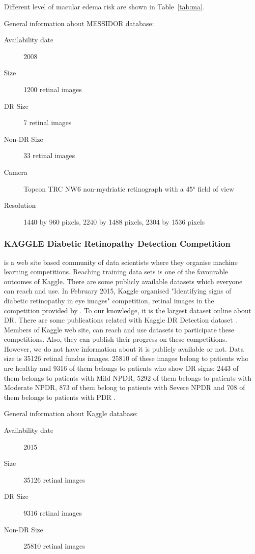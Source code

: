 Different level of macular edema risk are shown in Table~\ref{tab:ma}.


General information about MESSIDOR database:

\begin{description}
    \item[Availability date] 2008
    \item[Size] 1200 retinal images
    \item[DR Size] 7 retinal images
    \item[Non-DR Size] 33 retinal images
    \item[Camera]  Topcon TRC NW6 non-mydriatic retinograph with a 45° field of view
    \item[Resolution] 1440 by 960 pixels, 2240 by 1488 pixels, 2304 by 1536 pixels
\end{description}


\subsubsection{KAGGLE Diabetic Retinopathy Detection Competition}
\citet{KAGGLE} is a web site based community of data scientists where they organise machine learning competitions. Reaching training data sets is one of the favourable outcomes of Kaggle. There are some publicly available datasets which everyone can reach and use. In February 2015, Kaggle organised "Identifying signs of diabetic retinopathy in eye images" competition, retinal images in the competition provided by \citet{eyePACS}. To our knowledge, it is the largest dataset online about DR. There are some publications related with Kaggle DR Detection dataset \citep{albanautomated} \citep{van2016fast}. Members of Kaggle web site, can reach and use datasets to participate these competitions. Also, they can publish their progress on these competitions. However, we do not have information about it is publicly available or not. Data size is 35126 retinal fundus images\citep{van2016fast}. 25810 of these images belong to patients who are healthy and 9316 of them belongs to patients who show DR signs; 2443 of them belongs to patients with Mild NPDR, 5292 of them belongs to patients with Moderate NPDR, 873 of them belong to patients with Severe NPDR and 708 of them belongs to patients with PDR \citep{albanautomated}. 


General information about Kaggle database:
\begin{description}
    \item[Availability date] 2015
    \item[Size] 35126 retinal images
    \item[DR Size] 9316 retinal images
    \item[Non-DR Size] 25810 retinal images
\end{description}

